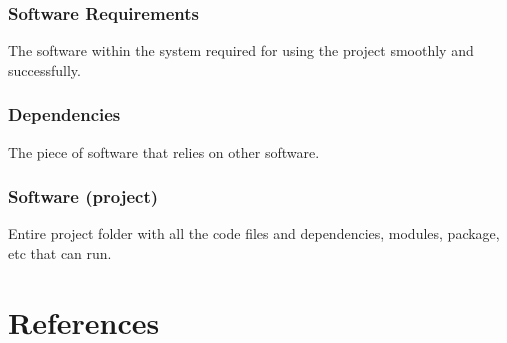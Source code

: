 \documentclass[11pt]{article}
\begin{document}
\subsubsection{Software Requirements}
\label{sec:orgcb6ac65}
The software within the system required for using the project smoothly and successfully.
\subsubsection{Dependencies}
\label{sec:org21b44a6}
The piece of software that relies on other software.
\subsubsection{Software (project)}
\label{sec:org6d80969}
Entire project folder with all the code files and dependencies, modules, package, etc that can run.
\clearpage
\section{References}
\label{sec:org3ea9852}
\end{document}
